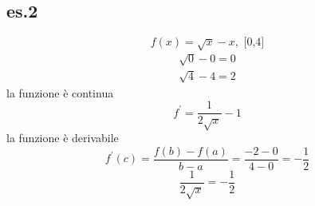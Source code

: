 \documentclass{article}
\begin{document}
\subsection{es.2}
\begin{equation*}
	f(x)=\sqrt{x}-x,\text{ [0,4]}
\end{equation*}
\begin{equation*}
	\begin{matrix}
		\sqrt{0}-0=0\\
		\sqrt{4}-4=2
	\end{matrix}
\end{equation*}
la funzione è continua
\begin{equation*}
	f^\prime=\frac{1}{2\sqrt{x}}-1
\end{equation*}
la funzione è derivabile
\begin{equation*}
	f^\prime(c)=\frac{f(b)-f(a)}{b-a}=\frac{-2-0}{4-0}=-\frac{1}{2}
\end{equation*}
\begin{equation*}
	\boxed{\frac{1}{2\sqrt{x}}=-\frac{1}{2}}
\end{equation*}
\end{document}
